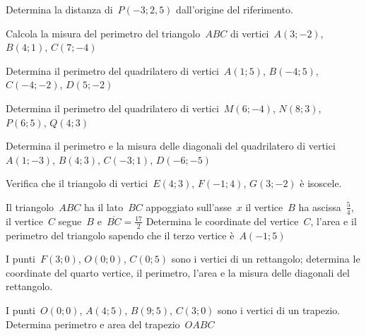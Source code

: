 \begin{esercizio}
\label{ese:D.23}
Determina la distanza di~\(P\left(-3;2,5\right)\) dall'origine del riferimento.
\end{esercizio}

\begin{esercizio}
\label{ese:D.24}
Calcola la misura del perimetro del triangolo~\(ABC\) di vertici~\(A(3;-2)\), \(B(4;1)\), \(C(7;-4)\)
\end{esercizio}

\begin{esercizio}
\label{ese:D.25}
Determina il perimetro del quadrilatero di vertici~\(A(1;5)\), \(B(-4;5)\), \(C(-4;-2)\), \(D(5;-2)\)
\end{esercizio}

\begin{esercizio}
\label{ese:D.26}
Determina il perimetro del quadrilatero di vertici~\(M(6;-4)\), \(N(8;3)\), \(P(6;5)\), \(Q(4;3)\)
\end{esercizio}

\begin{esercizio}
\label{ese:D.27}
Determina il perimetro e la misura delle diagonali del quadrilatero di vertici~\(A(1;-3)\), \(B(4;3)\), \(C(-3;1)\), \(D(-6;-5)\)
\end{esercizio}

\begin{esercizio}
\label{ese:D.28}
Verifica che il triangolo di vertici~\(E(4;3)\), \(F(-1;4)\), \(G(3;-2)\) è isoscele.
\end{esercizio}

\begin{esercizio}
\label{ese:D.29}
Il triangolo~\(ABC\) ha il lato~\(BC\) appoggiato sull'asse~\(x\) il vertice~\(B\) ha ascissa~\(\frac{5}{4}\),
il vertice~\(C\) segue~\(B\) e~\(\overline{BC}=\frac{17}{2}\) Determina le coordinate del vertice~\(C\),
l'area e il perimetro del triangolo sapendo che il terzo vertice è~\(A(-1;5)\)
\end{esercizio}

\begin{esercizio}
\label{ese:D.30}
I punti~\(F(3;0)\), \(O(0;0)\), \(C(0;5)\) sono i vertici di un rettangolo; determina le coordinate del quarto vertice, il perimetro,
l'area e la misura delle diagonali del rettangolo.
\end{esercizio}

\begin{esercizio}
\label{ese:D.31}
I punti~\(O(0;0)\), \(A(4;5)\), \(B(9;5)\), \(C(3;0)\) sono i vertici di un trapezio.
Determina perimetro e area del trapezio~\(OABC\)
\end{esercizio}

